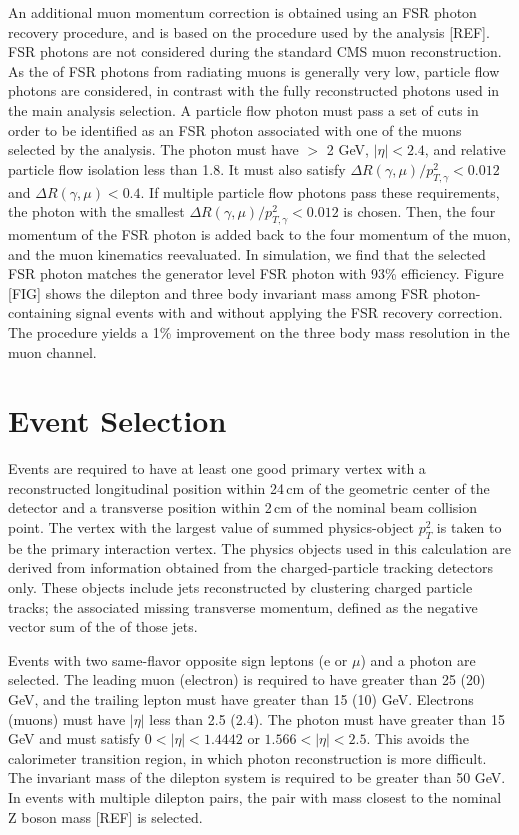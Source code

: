 An additional muon momentum correction is obtained using an FSR photon recovery procedure, and is based on the procedure used by the \hzz 
analysis [REF]. FSR photons are not considered during the standard CMS muon reconstruction. As the \pt of FSR photons from radiating 
muons is generally very low, particle flow photons are considered, in contrast with the fully reconstructed photons used in the main 
analysis selection. A particle flow photon must pass a set of cuts in order to be identified as an FSR photon associated with one of the 
muons selected by the analysis. The photon must have \pt $>$ 2 GeV, $|\eta|<2.4$, and relative particle flow isolation less than 1.8. 
It must also satisfy $\Delta R(\gamma, \mu)/p_{T,\gamma}^{2} < 0.012$ and $\Delta R(\gamma, \mu) < 0.4$. If multiple particle flow 
photons pass these requirements, the photon with the smallest $\Delta R(\gamma, \mu)/p_{T,\gamma}^{2} < 0.012$ is chosen. 
Then, the four momentum of the FSR photon is added back to the four momentum of the muon, and the muon kinematics reevaluated. 
In simulation, we find that the selected FSR photon matches the generator level FSR photon with 93\% efficiency. 
Figure [FIG] shows the dilepton and three body 
invariant mass among FSR photon-containing signal events with and without applying the FSR recovery correction.
The procedure yields a 1\% improvement on the three body mass resolution in the muon channel.

\section{Event Selection}
Events are required to have at least one good primary vertex
with a reconstructed longitudinal position within 24\,{cm} of the
geometric center of the detector and a transverse position within
2\,{cm} of the nominal beam collision point. The vertex with the largest value of summed physics-object
$p_{T}^2$ is taken to be the primary interaction vertex. The physics objects used in this calculation are derived from 
information obtained from the charged-particle tracking detectors only. These objects include jets reconstructed by 
clustering charged particle tracks; the associated missing transverse momentum, defined as the negative vector sum of the \pt of 
those jets.

Events with two same-flavor opposite sign leptons (e or $\mu$) and a photon are selected. The leading muon (electron) is required to have 
\pt greater than 25 (20) GeV, and the trailing lepton must have \pt greater than 15 (10) GeV. Electrons (muons) must have $|\eta|$ 
less than 2.5 (2.4). The photon must have \pt greater than 15 GeV and must satisfy $0 < |\eta| < 1.4442$ or $1.566 < |\eta| < 2.5$. 
This avoids the calorimeter transition region, in which photon reconstruction is more difficult. The invariant mass of the dilepton 
system is required to be greater than 50 GeV. In events with multiple dilepton pairs, the pair with mass closest to the nominal 
Z boson mass [REF] is selected. 

